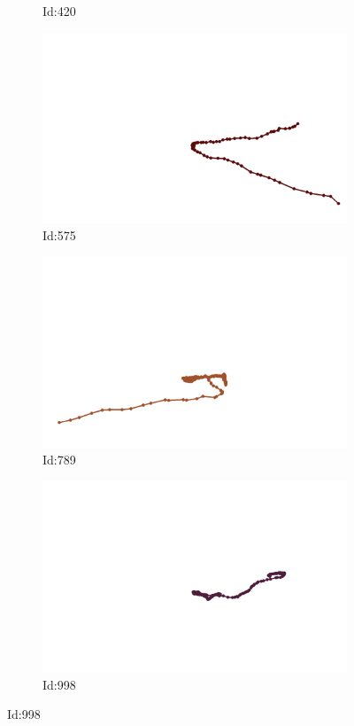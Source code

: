 \documentclass[12pt,twoside]{report}
\begin{document}
\begin{figure}
\begin{subfigure}[b]{0.20\textwidth}
\caption{Id:420}
\end{subfigure}
\begin{subfigure}[b]{0.20\textwidth}
\centering
\includegraphics[width=\textwidth]{../../trajectories/575.png}
\caption{Id:575}
\end{subfigure}
\begin{subfigure}[b]{0.20\textwidth}
\centering
\includegraphics[width=\textwidth]{../../trajectories/789.png}
\caption{Id:789}
\end{subfigure}
\begin{subfigure}[b]{0.20\textwidth}
\centering
\includegraphics[width=\textwidth]{../../trajectories/998.png}
\caption{Id:998}
\end{subfigure}
\end{figure}
\end{document}
